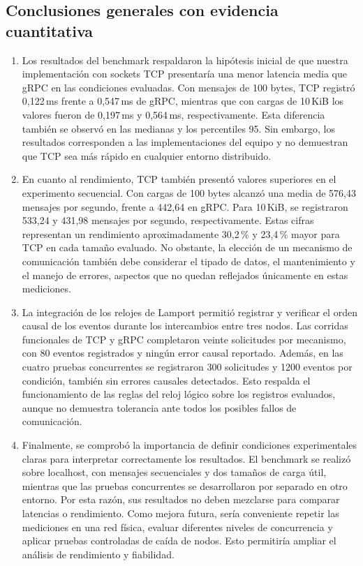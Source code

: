 \subsection{Conclusiones generales con evidencia cuantitativa}
\begin{enumerate}
    \item Los resultados del benchmark respaldaron la hipótesis inicial de que nuestra implementación con sockets TCP presentaría una menor latencia media que gRPC en las condiciones evaluadas. Con mensajes de 100 bytes, TCP registró 0,122\,ms frente a 0,547\,ms de gRPC, mientras que con cargas de 10\,KiB los valores fueron de 0,197\,ms y 0,564\,ms, respectivamente. Esta diferencia también se observó en las medianas y los percentiles 95. Sin embargo, los resultados corresponden a las implementaciones del equipo y no demuestran que TCP sea más rápido en cualquier entorno distribuido.

    \item En cuanto al rendimiento, TCP también presentó valores superiores en el experimento secuencial. Con cargas de 100 bytes alcanzó una media de 576,43 mensajes por segundo, frente a 442,64 en gRPC. Para 10\,KiB, se registraron 533,24 y 431,98 mensajes por segundo, respectivamente. Estas cifras representan un rendimiento aproximadamente 30,2\,\% y 23,4\,\% mayor para TCP en cada tamaño evaluado. No obstante, la elección de un mecanismo de comunicación también debe considerar el tipado de datos, el mantenimiento y el manejo de errores, aspectos que no quedan reflejados únicamente en estas mediciones.

    \item La integración de los relojes de Lamport permitió registrar y verificar el orden causal de los eventos durante los intercambios entre tres nodos. Las corridas funcionales de TCP y gRPC completaron veinte solicitudes por mecanismo, con 80 eventos registrados y ningún error causal reportado. Además, en las cuatro pruebas concurrentes se registraron 300 solicitudes y 1200 eventos por condición, también sin errores causales detectados. Esto respalda el funcionamiento de las reglas del reloj lógico sobre los registros evaluados, aunque no demuestra tolerancia ante todos los posibles fallos de comunicación.

    \item Finalmente, se comprobó la importancia de definir condiciones experimentales claras para interpretar correctamente los resultados. El benchmark se realizó sobre localhost, con mensajes secuenciales y dos tamaños de carga útil, mientras que las pruebas concurrentes se desarrollaron por separado en otro entorno. Por esta razón, sus resultados no deben mezclarse para comparar latencias o rendimiento. Como mejora futura, sería conveniente repetir las mediciones en una red física, evaluar diferentes niveles de concurrencia y aplicar pruebas controladas de caída de nodos. Esto permitiría ampliar el análisis de rendimiento y fiabilidad.

\end{enumerate}

